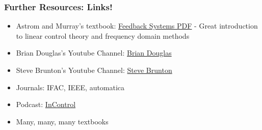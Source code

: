 \documentclass{beamer}
\begin{document}
\begin{frame}
\frametitle{Further Resources: Links!}
\begin{itemize}
    \item Astrom and Murray's textbook: \href{https://www.cds.caltech.edu/~murray/books/AM08/pdf/fbs-public_24Jul2020.pdf}{Feedback Systems PDF} - Great introduction to linear control theory and frequency domain methods
    \item Brian Douglas's Youtube Channel: \href{https://www.youtube.com/@BrianBDouglas}{Brian Douglas}
    \item Steve Brunton's Youtube Channel: \href{https://www.youtube.com/@Eigensteve}{Steve Brunton}
    \item Journals: IFAC, IEEE, automatica
    \item Podcast: \href{https://www.incontrolpodcast.com/}{InControl}
    \item Many, many, many textbooks
\end{itemize}
\end{frame}
\end{document}
